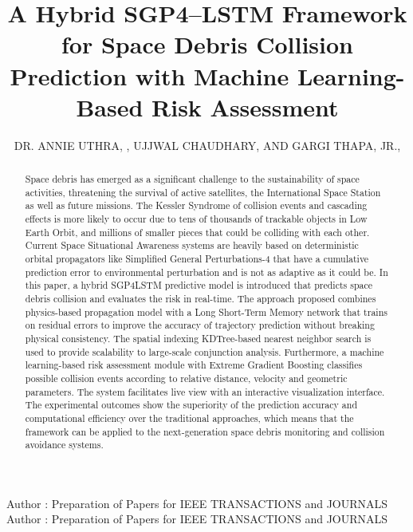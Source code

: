 \documentclass{ieeeaccess}
\begin{document}
\history{}
\doi{}

\title{A Hybrid SGP4–LSTM Framework for Space Debris Collision Prediction with Machine Learning-Based Risk Assessment}
\author{\uppercase{Dr. Annie Uthra}, ,
\uppercase{Ujjwal Chaudhary, and Gargi Thapa,
Jr}.,}
\address[1]{SRM Instutite of Science and Technology, Kattankulathur, Chennai (e-mail: annieu@srmist.edu.in)}
\address[2]{Department of Computational Intelligence}

\markboth
{Author \headeretal: Preparation of Papers for IEEE TRANSACTIONS and JOURNALS}
{Author \headeretal: Preparation of Papers for IEEE TRANSACTIONS and JOURNALS}


\begin{abstract}
Space debris has emerged as a significant challenge to the sustainability of space activities, threatening the survival of active satellites, the International Space Station as well as future missions. The Kessler Syndrome of collision events and cascading effects is more likely to occur due to tens of thousands of trackable objects in Low Earth Orbit, and millions of smaller pieces that could be colliding with each other. Current Space Situational Awareness systems are heavily based on deterministic orbital propagators like Simplified General Perturbations-4 that have a cumulative prediction error to environmental perturbation and is not as adaptive as it could be. In this paper, a hybrid SGP4LSTM predictive model is introduced that predicts space debris collision and evaluates the risk in real-time. The approach proposed combines physics-based propagation model with a Long Short-Term Memory network that trains on residual errors to improve the accuracy of trajectory prediction without breaking physical consistency. The spatial indexing KDTree-based nearest neighbor search is used to provide scalability to large-scale conjunction analysis. Furthermore, a machine learning-based risk assessment module with Extreme Gradient Boosting classifies possible collision events according to relative distance, velocity and geometric parameters. The system facilitates live view with an interactive visualization interface. The experimental outcomes show the superiority of the prediction accuracy and computational efficiency over the traditional approaches, which means that the framework can be applied to the next-generation space debris monitoring and collision avoidance systems.
\end{abstract}
\end{document}
